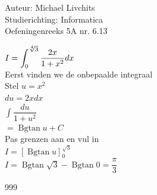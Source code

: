 \documentclass[a4paper]{article}
\newcommand{\dint}{\displaystyle\int}
\newcommand{\Bgtan}{\operatorname{Bgtan}}
\begin{document}
  
\noindent \large Auteur: Michael Livchits \\
\noindent \large Studierichting: Informatica\\
\noindent \large Oefeningenreeks 5A nr. 6.13\\

\medskip

\normalsize

$I = \displaystyle\dint_{0}^{\sqrt[4]{3}} \dfrac{2x}{1+x^2}dx$\\

Eerst vinden we de onbepaalde integraal\\

Stel $u = x^2$\\

$du = 2xdx$\\

$\displaystyle\int \dfrac{du}{1+u^2}$\\

$= \Bgtan u + C$\\

Pas grenzen aan en vul in\\

$I = \left[\Bgtan u\right]_{0}^{\sqrt{3}}$\\

$I = \Bgtan\sqrt{3} - \Bgtan0 = \dfrac{\pi}{3}$\\

\begin{thebibliography}{999}
\end{thebibliography}
\end{document}
